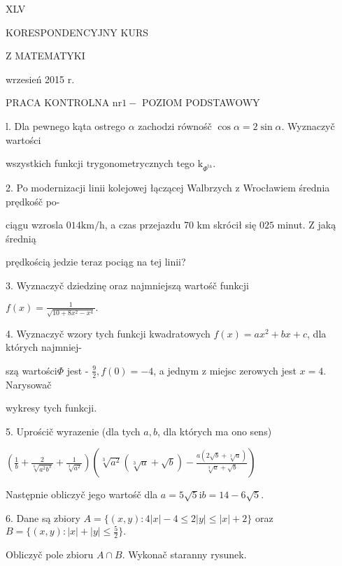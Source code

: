 \documentclass[a4paper,12pt]{article}
\begin{document}
XLV

KORESPONDENCYJNY KURS

Z MATEMATYKI

wrzesień 2015 r.

PRACA KONTROLNA $\mathrm{n}\mathrm{r} 1 -$ POZIOM PODSTAWOWY

l. Dla pewnego kąta ostrego $\alpha$ zachodzi równośč $\cos\alpha =  2\sin\alpha$. Wyznaczyč wartości

wszystkich funkcji trygonometrycznych tego $\mathrm{k}_{\Phi^{\mathrm{t}\mathrm{a}}}.$

2. Po modernizacji linii kolejowej łączącej Walbrzych $\mathrm{z}$ Wrocławiem średnia prędkośč po-

ciągu wzrosla $014\mathrm{k}\mathrm{m}/\mathrm{h}$, a czas przejazdu 70 km skrócił się $025$ minut. $\mathrm{Z}$ jaką średnią

prędkością jedzie teraz pociąg na tej linii?

3. Wyznaczyč dziedzinę oraz najmniejszą wartośč funkcji

$f(x)=\displaystyle \frac{1}{\sqrt{10+8x^{2}-x^{4}}}.$

4. Wyznaczyč wzory tych funkcji kwadratowych $f(x)=ax^{2}+bx+c$, dla których najmniej-

szą wartości$\Phi$ jest - $\displaystyle \frac{9}{2}, f(0) =-4$, a jednym $\mathrm{z}$ miejsc zerowych jest $x=4$. Narysowač

wykresy tych funkcji.

5. Uprościč wyrazenie (dla tych $a, b$, dla których ma ono sens)

$(\displaystyle \frac{1}{b}+\frac{2}{\sqrt[6]{a^{2}b^{3}}}+\frac{1}{\sqrt[3]{a^{2}}})(\sqrt[3]{a^{2}}(\sqrt[3]{a}+\sqrt{b})-\frac{a(2\sqrt{b}+\sqrt[3]{a})}{\sqrt[3]{a}+\sqrt{b}})$

Następnie obliczyč jego wartośč dla $a=5\sqrt{5}\mathrm{i}b=14-6\sqrt{5}.$

6. Dane są zbiory $A=\{(x,y):4|x|-4\leq 2|y|\leq|x|+2\}$ oraz $B=\displaystyle \{(x,y):|x|+|y|\leq\frac{5}{2}\}.$

Obliczyč pole zbioru $A\cap B$. Wykonač staranny rysunek.
\end{document}
